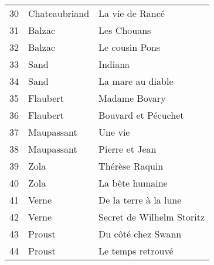 \begin{table}[H]
\begin{tabular}{l l l}
    30 & Chateaubriand & La vie de Rancé \\
    31 & Balzac & Les Chouans \\
    32 & Balzac & Le cousin Pons \\
    33 & Sand & Indiana \\
    34 & Sand & La mare au diable \\
    35 & Flaubert & Madame Bovary \\
    36 & Flaubert & Bouvard et Pécuchet \\
    37 & Maupassant & Une vie \\
    38 & Maupassant & Pierre et Jean \\
    39 & Zola & Thérèse Raquin \\
    40 & Zola & La bête humaine \\
    41 & Verne & De la terre à la lune \\
    42 & Verne & Secret de Wilhelm Storitz \\
    43 & Proust & Du côté chez Swann \\
    44 & Proust & Le temps retrouvé \\
    \bottomrule
  \end{tabular}
\end{table}

\onecolumn

